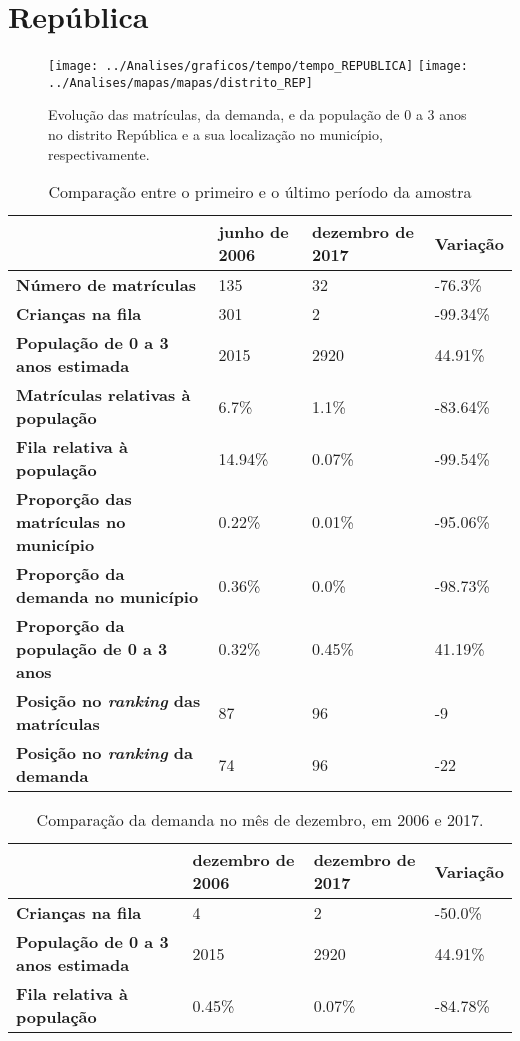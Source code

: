 \section{República}
\begin{figure}[H]
\centering
\texttt{[image: ../Analises/graficos/tempo/tempo\_REPUBLICA]}
\texttt{[image: ../Analises/mapas/mapas/distrito\_REP]}
\caption{Evolução das matrículas, da demanda, e da população de 0 a 3 anos no distrito República e a sua localização no município, respectivamente.}
\end{figure}
\begin{table}[H]
\begin{tabular}{l|l|l|l}
\textbf{}                                      & \textbf{junho de 2006}       & \textbf{dezembro de 2017}    & \textbf{Variação} \\ \hline
\textbf{Número de matrículas}                  & 135 & 32 & -76.3\% \\ \hline
\textbf{Crianças na fila}                      & 301 & 2 & -99.34\% \\ \hline
\textbf{População de 0 a 3 anos estimada}      & 2015 & 2920 & 44.91\% \\ \hline
\textbf{Matrículas relativas à população}      & 6.7\% & 1.1\% & -83.64\% \\ \hline
\textbf{Fila relativa à população}             & 14.94\% & 0.07\% & -99.54\% \\ \hline
\textbf{Proporção das matrículas no município} & 0.22\% & 0.01\% & -95.06\% \\ \hline
\textbf{Proporção da demanda no município}     & 0.36\% & 0.0\% & -98.73\% \\ \hline
\textbf{Proporção da população de 0 a 3 anos}  & 0.32\% & 0.45\% & 41.19\% \\ \hline
\textbf{Posição no \textit{ranking} das matrículas}     & 87 & 96 & -9 \\ \hline
\textbf{Posição no \textit{ranking} da demanda}         & 74 & 96 & -22 \\ 
\end{tabular}
\caption{Comparação entre o primeiro e o último período da amostra}
\end{table}
\begin{table}[H]
\begin{tabular}{l|l|l|l}
\textbf{}                                 & \textbf{dezembro de 2006} & \textbf{dezembro de 2017} & \textbf{Variação} \\ \hline
\textbf{Crianças na fila}                      & 4 & 2 & -50.0\% \\ \hline
\textbf{População de 0 a 3 anos estimada}      & 2015 & 2920 & 44.91\% \\ \hline
\textbf{Fila relativa à população}             & 0.45\% & 0.07\% & -84.78\% \\
\end{tabular}
\caption{Comparação da demanda no mês de dezembro, em 2006 e 2017.}
\end{table}
